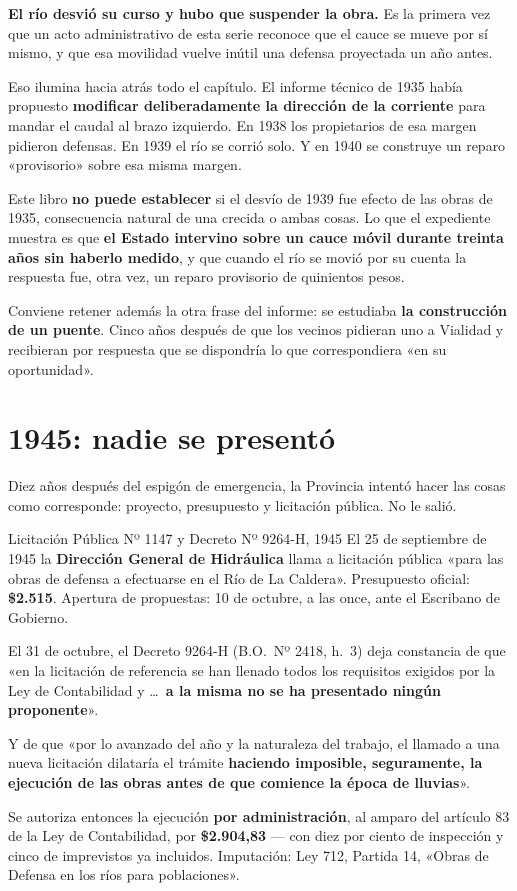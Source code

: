 \textbf{El río desvió su curso y hubo que suspender la obra.} Es la primera vez que un acto
administrativo de esta serie reconoce que el cauce se mueve por sí mismo, y que esa
movilidad vuelve inútil una defensa proyectada un año antes.

Eso ilumina hacia atrás todo el capítulo. El informe técnico de 1935 había propuesto
\textbf{modificar deliberadamente la dirección de la corriente} para mandar el caudal al
brazo izquierdo. En 1938 los propietarios de esa margen pidieron defensas. En 1939 el río se
corrió solo. Y en 1940 se construye un reparo «provisorio» sobre esa misma margen.

Este libro \textbf{no puede establecer} si el desvío de 1939 fue efecto de las obras de 1935,
consecuencia natural de una crecida o ambas cosas. Lo que el expediente muestra es que
\textbf{el Estado intervino sobre un cauce móvil durante treinta años sin haberlo medido}, y que cuando el río se movió por su cuenta la respuesta fue, otra vez, un reparo
provisorio de quinientos pesos.

Conviene retener además la otra frase del informe: se estudiaba \textbf{la construcción de un
puente}. Cinco años después de que los vecinos pidieran uno a Vialidad y recibieran por
respuesta que se dispondría lo que correspondiera «en su oportunidad».

\section{1945: nadie se presentó}

Diez años después del espigón de emergencia, la Provincia intentó hacer las cosas como
corresponde: proyecto, presupuesto y licitación pública. No le salió.

\begin{ficha}{Licitación Pública Nº 1147 y Decreto Nº 9264-H, 1945}
El 25 de septiembre de 1945 la \textbf{Dirección General de Hidráulica} llama a licitación
pública «para las obras de defensa a efectuarse en el Río de La Caldera». Presupuesto oficial:
\textbf{\$2.515}. Apertura de propuestas: 10 de octubre, a las once, ante el Escribano de
Gobierno.

El 31 de octubre, el Decreto 9264-H (B.O.\ Nº 2418, h.\ 3) deja constancia de que «en la licitación de referencia se
han llenado todos los requisitos exigidos por la Ley de Contabilidad y \ldots\ \textbf{a la
misma no se ha presentado ningún proponente}».

Y de que «por lo avanzado del año y la naturaleza del trabajo, el llamado a una nueva
licitación dilataría el trámite \textbf{haciendo imposible, seguramente, la ejecución de las
obras antes de que comience la época de lluvias}».

Se autoriza entonces la ejecución \textbf{por administración}, al amparo del artículo 83 de la
Ley de Contabilidad, por \textbf{\$2.904,83} --- con diez por ciento de inspección y cinco de
imprevistos ya incluidos. Imputación: Ley 712, Partida 14, «Obras de Defensa en los ríos para
poblaciones».
\end{ficha}

